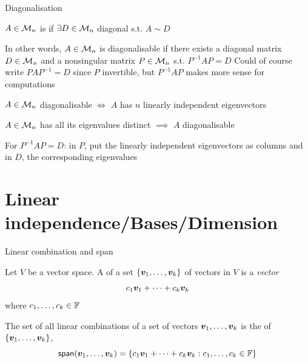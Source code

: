 \documentclass[aspectratio=169]{beamer}\usepackage[]{graphicx}\usepackage[]{xcolor}
\begin{document}
\begin{frame}{Diagonalisation}
\begin{definition}[Diagonalisability]
$A\in\mathcal{M}_n$ is  if $\exists D\in\mathcal{M}_n$ diagonal s.t. $A\sim D$
\end{definition}
\vfill
In other words, $A\in\mathcal{M}_n$ is diagonalisable if there exists a diagonal matrix $D\in\mathcal{M}_n$ and a nonsingular matrix $P\in\mathcal{M}_n$ s.t. $P^{-1}AP=D$
\vfill
Could of course write $PAP^{-1}=D$ since $P$ invertible, but $P^{-1}AP$ makes more sense for computations
\end{frame}


\begin{frame}
\begin{importanttheorem}
$A\in\mathcal{M}_n$ diagonalisable $\iff$ $A$ has $n$ linearly independent eigenvectors
\end{importanttheorem}
\vfill
\begin{corollary}
$A\in\mathcal{M}_n$ has all its eigenvalues distinct $\implies$ $A$ diagonalisable
\end{corollary}
\vfill
For $P^{-1}AP=D$: in $P$, put the linearly independent eigenvectors as columns and in $D$, the corresponding eigenvalues
\end{frame}


\section{Linear independence/Bases/Dimension}

\begin{frame}{Linear combination and span}
	\begin{definition}
		Let $V$ be a vector space.
		A  of a set $\{\bm{v}_1,\ldots,\bm{v}_k\}$ of vectors in $V$ is a \emph{vector}
		\[
		c_1\bm{v}_1+\cdots+c_k\bm{v}_k
		\]
		where $c_1,\ldots,c_k\in\mathbb{F}$
	\end{definition}
	\vfill
	\begin{definition}[Span]
		The set of all linear combinations of a set of vectors $\bm{v}_1,\ldots,\bm{v}_k$ is the  of $\{\bm{v}_1,\ldots,\bm{v}_k\}$,
		\[
		\mathsf{span}(\bm{v}_1,\ldots,\bm{v}_k)=
		\left\{
		c_1\bm{v}_1+\cdots+c_k\bm{v}_k:c_1,\ldots,c_k\in\mathbb{F}
		\right\}
		\]
	\end{definition}
\end{frame}
\end{document}
